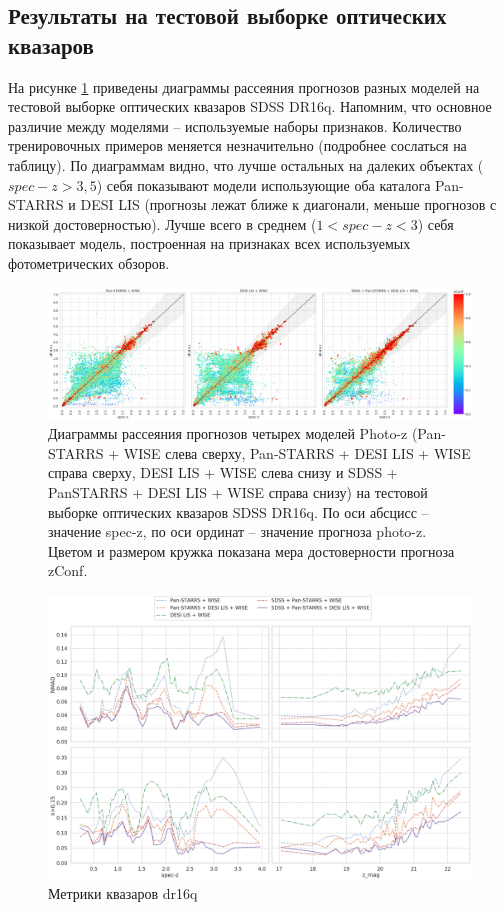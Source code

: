 \documentclass[fleqn,usenatbib]{mnras}
\begin{document}
\subsection{Результаты на тестовой выборке оптических квазаров}

На рисунке \ref{fig:dr16q_wo_train} приведены диаграммы рассеяния прогнозов разных моделей на тестовой выборке оптических квазаров SDSS DR16q. Напомним, что основное различие между моделями -- используемые наборы признаков. Количество тренировочных примеров меняется незначительно (подробнее сослаться на таблицу). По диаграммам видно, что  лучше остальных на далеких объектах ($spec-z > 3,5$) себя показывают модели использующие оба каталога Pan-STARRS и DESI LIS (прогнозы лежат ближе к диагонали, меньше прогнозов с низкой достоверностью). Лучше всего в среднем ($1 < spec-z < 3$) себя показывает модель, построенная на признаках всех используемых фотометрических обзоров.

\begin{figure}
    \centering
    \includegraphics[width=0.9\linewidth]{images/scatterplots-dr16q-wo-train.png}
    \caption{Диаграммы рассеяния прогнозов четырех моделей Photo-z (Pan-STARRS + WISE слева сверху, Pan-STARRS + DESI LIS + WISE справа сверху, DESI LIS + WISE слева снизу и SDSS + PanSTARRS + DESI LIS + WISE справа снизу) на тестовой выборке оптических квазаров SDSS DR16q. По оси абсцисс -- значение spec-z, по оси ординат -- значение прогноза photo-z. Цветом и размером кружка показана мера достоверности прогноза zConf.}
    \label{fig:dr16q_wo_train}
\end{figure}

\begin{figure}
    \centering
    \includegraphics[width=0.9\linewidth]{images/metrics-dr16q.png}
    \caption{Метрики квазаров dr16q}
    \label{fig:metrics-cv2-gal}
\end{figure}
\end{document}
